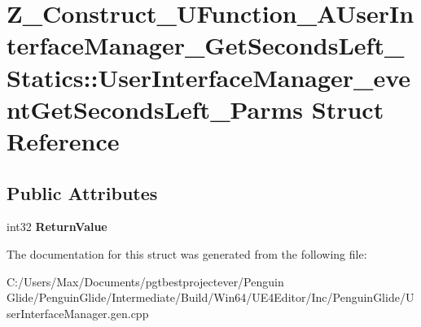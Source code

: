 \hypertarget{struct_z___construct___u_function___a_user_interface_manager___get_seconds_left___statics_1_1_usb72e3e8755be6fd85ca6813b22c3485d}{}\section{Z\+\_\+\+Construct\+\_\+\+U\+Function\+\_\+\+A\+User\+Interface\+Manager\+\_\+\+Get\+Seconds\+Left\+\_\+\+Statics\+::User\+Interface\+Manager\+\_\+event\+Get\+Seconds\+Left\+\_\+\+Parms Struct Reference}
\label{struct_z___construct___u_function___a_user_interface_manager___get_seconds_left___statics_1_1_usb72e3e8755be6fd85ca6813b22c3485d}
\subsection*{Public Attributes}
\begin{DoxyCompactItemize}
\item 
\mbox{\label{struct_z___construct___u_function___a_user_interface_manager___get_seconds_left___statics_1_1_usb72e3e8755be6fd85ca6813b22c3485d_a775e0599a1da470db8a43b3f2738208d}} 
int32 {\bfseries Return\+Value}
\end{DoxyCompactItemize}


The documentation for this struct was generated from the following file\+:\begin{DoxyCompactItemize}
\item 
C\+:/\+Users/\+Max/\+Documents/pgtbestprojectever/\+Penguin Glide/\+Penguin\+Glide/\+Intermediate/\+Build/\+Win64/\+U\+E4\+Editor/\+Inc/\+Penguin\+Glide/User\+Interface\+Manager.\+gen.\+cpp\end{DoxyCompactItemize}
